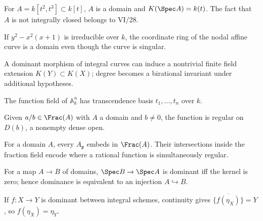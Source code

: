 \begin{example}\label{advex:vi27-01}
For $A=k[t^2,t^3]\subset k[t]$, $A$ is a domain and $K(\Spec A)=k(t)$.  The fact that $A$ is not integrally closed belongs to VI/28.
\end{example}

\begin{example}\label{advex:vi27-02}
If $y^2-x^2(x+1)$ is irreducible over $k$, the coordinate ring of the nodal affine curve is a domain even though the curve is singular.
\end{example}

\begin{example}\label{advex:vi27-03}
A dominant morphism of integral curves can induce a nontrivial finite field extension $K(Y)\subset K(X)$; degree becomes a birational invariant under additional hypotheses.
\end{example}

\begin{example}\label{advex:vi27-04}
The function field of $\mathbb A^n_k$ has transcendence basis $t_1,\dots,t_n$ over $k$.
\end{example}

\begin{example}\label{advex:vi27-05}
Given $a/b\in\Frac(A)$ with $A$ a domain and $b\ne0$, the function is regular on $D(b)$, a nonempty dense open.
\end{example}

\begin{example}\label{advex:vi27-06}
For a domain $A$, every $A_{\mathfrak p}$ embeds in $\Frac(A)$.  Their intersections inside the fraction field encode where a rational function is simultaneously regular.
\end{example}

\begin{example}\label{advex:vi27-07}
For a map $A\to B$ of domains, $\Spec B\to\Spec A$ is dominant iff the kernel is zero; hence dominance is equivalent to an injection $A\hookrightarrow B$.
\end{example}

\begin{example}\label{advex:vi27-08}
If $f:X\to Y$ is dominant between integral schemes, continuity gives $\overline{\{f(\eta_X)\}}=Y$, so $f(\eta_X)=\eta_Y$.
\end{example}

